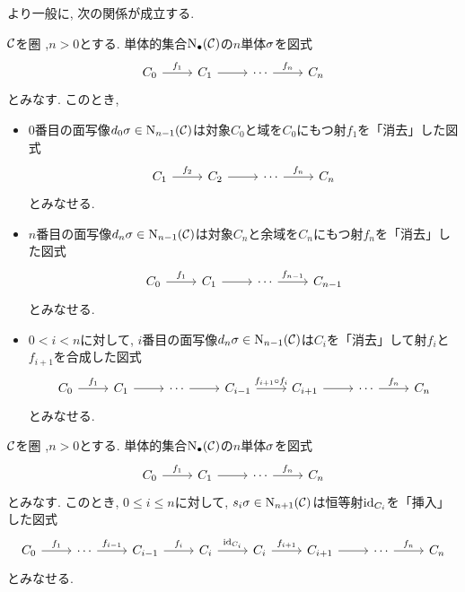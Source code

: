\documentclass[uplatex, a4paper, 14Q, dvipdfmx]{jsreport}
\begin{document}
より一般に, 次の関係が成立する. 

\begin{remark}
  $\mathcal{C}$を圏 ,$n>0$とする. 
  単体的集合$\mathrm{N}_{\bullet}(\mathcal{C})$の$n$単体$\sigma$を図式
  \[\begin{tikzcd}
    {C_0} & {C_1} & \cdots & {C_n}
    \arrow[from=1-2, to=1-3]
    \arrow["{f_n}", from=1-3, to=1-4]
    \arrow["{f_1}", from=1-1, to=1-2]
  \end{tikzcd}\]
  とみなす. 
  このとき, 
  \begin{itemize}
    \item $0$番目の面写像$d_0\sigma \in \mathrm{N}_{n-1}(\mathcal{C})$は対象$C_0$と域を$C_0$にもつ射$f_1$を「消去」した図式
    \[\begin{tikzcd}
      {C_1} & {C_2} & \cdots & {C_n}
      \arrow[from=1-2, to=1-3]
      \arrow["{f_n}", from=1-3, to=1-4]
      \arrow["{f_2}", from=1-1, to=1-2]
    \end{tikzcd}\]
    とみなせる. 
    \item $n$番目の面写像$d_n\sigma \in \mathrm{N}_{n-1}(\mathcal{C})$は対象$C_n$と余域を$C_n$にもつ射$f_n$を「消去」した図式
    \[\begin{tikzcd}
      {C_0} & {C_1} & \cdots & {C_{n-1}}
      \arrow[from=1-2, to=1-3]
      \arrow["{f_{n-1}}", from=1-3, to=1-4]
      \arrow["{f_1}", from=1-1, to=1-2]
    \end{tikzcd}\]
    とみなせる. 
    \item $0<i<n$に対して, $i$番目の面写像$d_n\sigma \in \mathrm{N}_{n-1}(\mathcal{C})$は$C_i$を「消去」して射$f_i$と$f_{i+1}$を合成した図式
    \[\begin{tikzcd}
      {C_0} & {C_1} & \cdots & {C_{i-1}} & {C_{i+1}} & \cdots & {C_n}
      \arrow["{f_{i+1} \ci f_i}", from=1-4, to=1-5]
      \arrow[from=1-5, to=1-6]
      \arrow["{f_n}", from=1-6, to=1-7]
      \arrow[from=1-3, to=1-4]
      \arrow["{f_1}", from=1-1, to=1-2]
      \arrow[from=1-2, to=1-3]
    \end{tikzcd}\]
    とみなせる. 
  \end{itemize}
\end{remark}

\begin{remark}
  $\mathcal{C}$を圏 ,$n>0$とする. 
  単体的集合$\mathrm{N}_{\bullet}(\mathcal{C})$の$n$単体$\sigma$を図式
  \[\begin{tikzcd}
    {C_0} & {C_1} & \cdots & {C_n}
    \arrow[from=1-2, to=1-3]
    \arrow["{f_n}", from=1-3, to=1-4]
    \arrow["{f_1}", from=1-1, to=1-2]
  \end{tikzcd}\]
  とみなす. 
  このとき, $0 \leq i \leq n$に対して, $s_i\sigma \in \mathrm{N}_{n+1}(\mathcal{C})$は恒等射$\mathrm{id}_{C_i}$を「挿入」した図式
  \[\begin{tikzcd}
    {C_0} & \cdots & {C_{i-1}} & {C_i} & {C_i} & {C_{i+1}} & \cdots & {C_n}
    \arrow["{f_{i+1}}", from=1-5, to=1-6]
    \arrow[from=1-6, to=1-7]
    \arrow["{f_n}", from=1-7, to=1-8]
    \arrow["{\id_{C_i}}", from=1-4, to=1-5]
    \arrow["{f_{i-1}}", from=1-2, to=1-3]
    \arrow["{f_i}", from=1-3, to=1-4]
    \arrow["{f_1}", from=1-1, to=1-2]
  \end{tikzcd}\]
  とみなせる. 
\end{remark}
\end{document}
